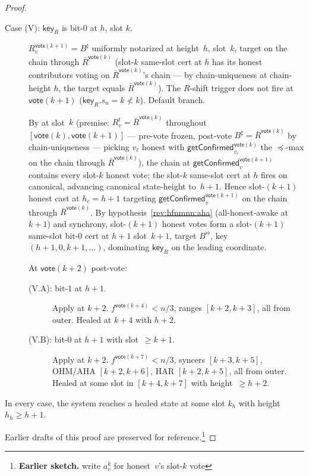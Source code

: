 \ifx\litemode\undefined\documentclass{article}\fi
\newcommand{\key}{\mathsf{key}}
\newcommand{\vote}{\mathsf{vote}}
\newcommand{\comm}[1]{\bar{#1}}
\newcommand{\getConfirmed}{\textsf{getConfirmed}\xspace}
\theoremstyle{plain}
\theoremstyle{definition}
\theoremstyle{remark}
\newcommand{\AHA}{all-honest-awake\xspace}
\begin{document}
\begin{proof}
\begin{description}
\item[{Case (V): $\key_R$ is bit-$0$ at $h$, slot $k$.}]\hfill

$R_v^{\vote(k+1)} = B^\sharp$ uniformly notarized at height~$h$, slot~$k$, target on the chain through $\comm{R}^{\vote(k)}$ (slot-$k$ same-slot cert at $h$ has its honest contributors voting on $\comm{R}^{\vote(k)}$'s chain — by chain-uniqueness at chain-height $h$, the target equals $\comm{R}^{\vote(k)}$). The $R$-shift trigger does not fire at $\vote(k+1)$ ($\key_R.s_n = k \not< k$). Default branch.

By  at slot~$k$ (premise: $R_v^t = \comm{R}^{\vote(k)}$ throughout $[\vote(k), \vote(k+1)]$ — pre-vote frozen, post-vote $B^\sharp = \comm{R}^{\vote(k)}$ by chain-uniqueness — picking $v_\ell$ honest with $\getConfirmed_{v_\ell}^{\vote(k)}$ the $\preceq$-max on the chain through $\comm{R}^{\vote(k)}$), the chain at $\getConfirmed_v^{\vote(k+1)}$ contains every slot-$k$ honest vote; the slot-$k$ same-slot cert at $h$ fires on canonical, advancing canonical state-height to~$h+1$. Hence slot-$(k+1)$ honest cast at $h_c = h+1$ targeting $\getConfirmed_v^{\vote(k+1)}$ on the chain through $\comm{R}^{\vote(k)}$. By hypothesis~\ref{rev:hfnmnn:aha} (\AHA at $k+1$) and synchrony, slot-$(k+1)$ honest votes form a slot-$(k+1)$ same-slot bit-$0$ cert at $h+1$ slot~$k+1$, target $B^{\flat\flat}$, key $(h+1, 0, k+1, \ldots)$, dominating $\key_R$ on the leading coordinate.

At $\vote(k+2)$ post-vote:
\begin{description}
  \item[{(V.A): bit-$1$ at $h+1$.}] Apply  at $k+2$. $f^{\vote(k+4)} < n/3$, ranges $[k+2, k+3]$, all from outer. Healed at $k+4$ with $h+2$.
  \item[{(V.B): bit-$0$ at $h+1$ with slot~$\geq k+1$.}] Apply  at $k+2$. $f^{\vote(k+7)} < n/3$, syncers $[k+3, k+5]$, OHM/AHA $[k+2, k+6]$, HAR $[k+2, k+5]$, all from outer. Healed at some slot in $[k+4, k+7]$ with height~$\geq h+2$.
\end{description}
\end{description}

In every case, the system reaches a healed state at some slot $k_h$ with height $h_h \geq h+1$.

\noindent Earlier drafts of this proof are preserved for reference.\footnote{\textbf{Earlier sketch.} write $a^k_v$ for honest~$v$'s slot-$k$ vote
 
}
\end{proof}
\end{document}
